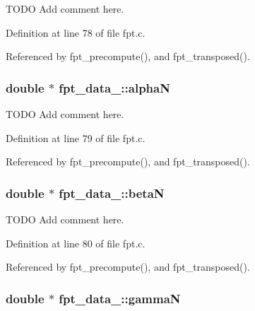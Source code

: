 T\-O\-D\-O Add comment here. 



Definition at line 78 of file fpt.\-c.



Referenced by fpt\-\_\-precompute(), and fpt\-\_\-transposed().

\hypertarget{structfpt__data___a8474f38ec1ed4d1c41235de523fc2519}{
\subsubsection[{alpha\-N}]{\setlength{\rightskip}{0pt plus 5cm}double $\ast$ fpt\-\_\-data\-\_\-\-::alpha\-N}}\label{structfpt__data___a8474f38ec1ed4d1c41235de523fc2519}


T\-O\-D\-O Add comment here. 



Definition at line 79 of file fpt.\-c.



Referenced by fpt\-\_\-precompute(), and fpt\-\_\-transposed().

\hypertarget{structfpt__data___ae62530023226d004ccaa18f4e1565e8d}{
\subsubsection[{beta\-N}]{\setlength{\rightskip}{0pt plus 5cm}double $\ast$ fpt\-\_\-data\-\_\-\-::beta\-N}}\label{structfpt__data___ae62530023226d004ccaa18f4e1565e8d}


T\-O\-D\-O Add comment here. 



Definition at line 80 of file fpt.\-c.



Referenced by fpt\-\_\-precompute(), and fpt\-\_\-transposed().

\hypertarget{structfpt__data___a606df2fa8fb3173a8ced31366b0bcc8a}{
\subsubsection[{gamma\-N}]{\setlength{\rightskip}{0pt plus 5cm}double $\ast$ fpt\-\_\-data\-\_\-\-::gamma\-N}}\label{structfpt__data___a606df2fa8fb3173a8ced31366b0bcc8a}


